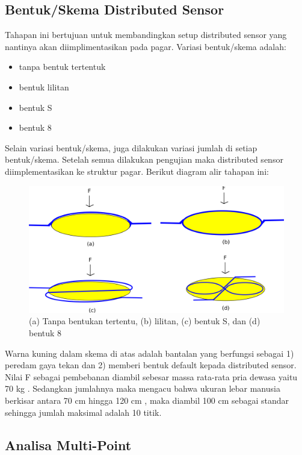 \documentclass[12pt]{article}
\begin{document}
	\subsection{Bentuk/Skema Distributed Sensor}
	
	Tahapan ini bertujuan untuk membandingkan setup distributed sensor  yang nantinya akan diimplimentasikan pada pagar.
	Variasi bentuk/skema adalah:
	
	\begin{itemize}
		\item tanpa bentuk tertentuk
		\item bentuk lilitan
		\item bentuk S
		\item bentuk 8
	\end{itemize}

	Selain variasi bentuk/skema, juga dilakukan variasi jumlah di setiap bentuk/skema.
	Setelah semua dilakukan pengujian maka distributed sensor diimplementasikan ke struktur pagar. 
	Berikut diagram alir tahapan ini:
	
	\begin{figure}[h!]
		\centering
		\captionsetup{justification=centering}
		\includegraphics[width=0.7\linewidth]{images/Bab_3/Bab_3_7}
		\caption[Skema Uji]{\small{(a) Tanpa bentukan tertentu, (b) lilitan, (c) bentuk S, dan (d) bentuk 8}}
	\end{figure}

	Warna kuning dalam skema di atas adalah bantalan yang berfungsi sebagai 1) peredam gaya tekan dan 2) memberi bentuk default kepada distributed sensor.
	Nilai F sebagai pembebanan diambil sebesar massa rata-rata pria dewasa yaitu 70 kg \cite{Huang2017}.
	Sedangkan jumlahnya maka mengacu bahwa ukuran lebar manusia berkisar antara 70 cm hingga 120 cm \cite{Ramsey1980}, maka diambil 100 cm sebagai standar sehingga jumlah maksimal adalah 10 titik.
	
	\subsection{Analisa Multi-Point}
	
\end{document}
